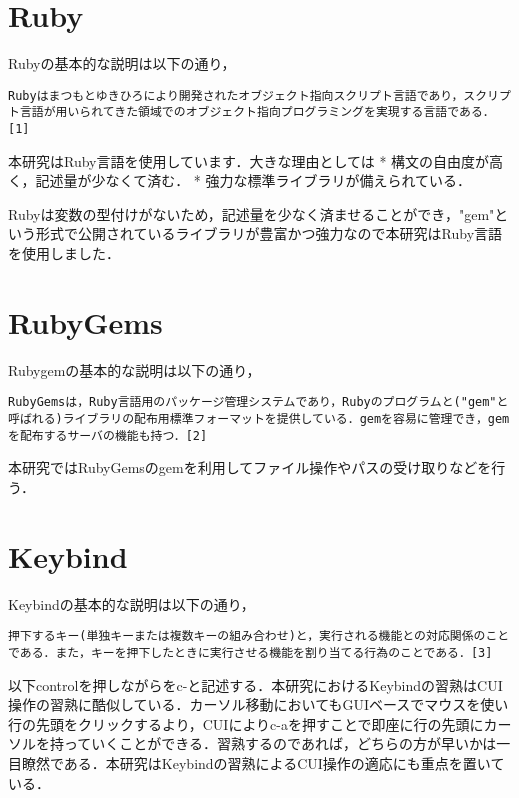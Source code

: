     \section{Ruby}\label{ruby}

Rubyの基本的な説明は以下の通り，

\begin{verbatim}
Rubyはまつもとゆきひろにより開発されたオブジェクト指向スクリプト言語であり，スクリプト言語が用いられてきた領域でのオブジェクト指向プログラミングを実現する言語である．[1]
\end{verbatim}

本研究はRuby言語を使用しています．大きな理由としては *
構文の自由度が高く，記述量が少なくて済む． *
強力な標準ライブラリが備えられている．

Rubyは変数の型付けがないため，記述量を少なく済ませることができ，"gem"という形式で公開されているライブラリが豊富かつ強力なので本研究はRuby言語を使用しました．

    \section{RubyGems}\label{rubygems}

Rubygemの基本的な説明は以下の通り，

\begin{verbatim}
RubyGemsは，Ruby言語用のパッケージ管理システムであり，Rubyのプログラムと("gem"と呼ばれる)ライブラリの配布用標準フォーマットを提供している．gemを容易に管理でき，gemを配布するサーバの機能も持つ．[2]
\end{verbatim}

本研究ではRubyGemsのgemを利用してファイル操作やパスの受け取りなどを行う．

    \section{Keybind}\label{keybind}

Keybindの基本的な説明は以下の通り，

\begin{verbatim}
押下するキー(単独キーまたは複数キーの組み合わせ)と，実行される機能との対応関係のことである．また，キーを押下したときに実行させる機能を割り当てる行為のことである．[3]
\end{verbatim}

以下controlを押しながらをc-と記述する．本研究におけるKeybindの習熟はCUI操作の習熟に酷似している．カーソル移動においてもGUIベースでマウスを使い行の先頭をクリックするより，CUIによりc-aを押すことで即座に行の先頭にカーソルを持っていくことができる．習熟するのであれば，どちらの方が早いかは一目瞭然である．本研究はKeybindの習熟によるCUI操作の適応にも重点を置いている．

